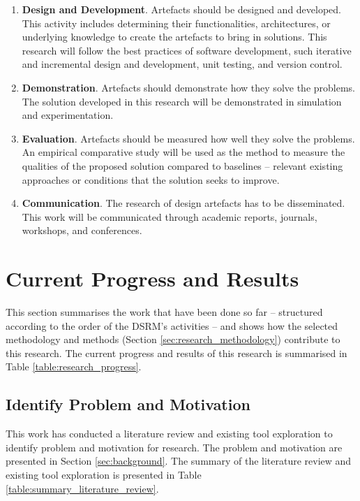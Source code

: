 \documentclass[12pt, a4paper]{report} \usepackage[titletoc]{appendix}
\begin{document}
\begin{enumerate}
    \item \textbf{Design and Development}. Artefacts should be designed and developed. This activity includes determining their functionalities, architectures, or underlying knowledge to create the artefacts to bring in solutions. This research will follow the best practices of software development, such iterative and incremental design and development, unit testing, and version control.
    \item \textbf{Demonstration}. Artefacts should demonstrate how they solve the problems. The solution developed in this research will be demonstrated in simulation and experimentation. 
    \item \textbf{Evaluation}. Artefacts should be measured how well they solve the problems. An empirical comparative study will be used as the method to measure the qualities of the proposed solution compared to baselines -- relevant existing approaches or conditions that the solution seeks to improve.
    \item \textbf{Communication}. The research of design artefacts has to be disseminated. This work will be communicated through academic reports, journals, workshops, and conferences.
\end{enumerate}

\section{Current Progress and Results}
\label{sec:current_progress_and_results}
This section summarises the work that have been done so far -- structured according to the order of the DSRM's activities -- and shows how the selected methodology and methods (Section \ref{sec:research_methodology}) contribute to this research. The current progress and results of this research is summarised in Table \ref{table:research_progress}.

\subsection{Identify Problem and Motivation}
\label{subsec:identify_problem_and_motivation}
This work has conducted a literature review and existing tool exploration to identify problem and motivation for research. The problem and motivation are presented in Section \ref{sec:background}. The summary of the literature review and existing tool exploration is presented in Table \ref{table:summary_literature_review}.
\end{document}
